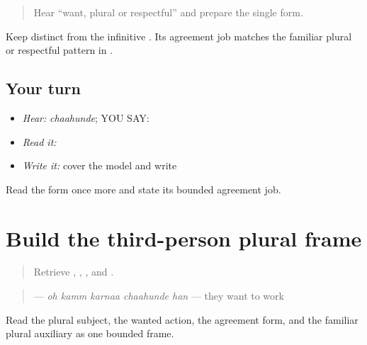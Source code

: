 \label{lesson:PA-C189-chahunde-review}



\begin{quote}
Hear “want, plural or respectful” and prepare the single form.
\end{quote}

\begin{grammarlens}[title={Grammar Lens}]
Keep \textbf{} distinct from the infinitive \textbf{}. Its agreement job matches the familiar plural or respectful pattern in \textbf{}.
\end{grammarlens}

\subsection*{Your turn}
\begin{itemize}
\raggedright
  \item \emph{Hear:} \emph{chaahunde}; YOU SAY: \textbf{}
  \item \emph{Read it:} \textbf{}
  \item \emph{Write it:} cover the model and write \textbf{}
\end{itemize}

\begin{tcolorbox}[breakable,colback=teal!4,colframe=teal!35!black,title={Before you move on}]
Read the form once more and state its bounded agreement job.
\end{tcolorbox}
\section[\texorpdfstring{\pa{ਉਹ} \pa{ਕੰਮ} \pa{ਕਰਨਾ} \pa{ਚਾਹੁੰਦੇ} \pa{ਹਨ} (oh kamm karnaa …)}{ਉਹ ਕੰਮ ਕਰਨਾ ਚਾਹੁੰਦੇ ਹਨ (oh kamm karnaa …)}]{Build the third-person plural frame}

\label{lesson:PA-C189-chahunde-han}



\begin{quote}
Retrieve \textbf{}, \textbf{}, \textbf{}, and \textbf{}.
\end{quote}

\begin{grammarlens}[title={Grammar Lens: complete statement}]
\begin{quote}
\textbf{    } — \emph{oh kamm karnaa chaahunde han} — they want to work
\end{quote}

Read the plural subject, the wanted action, the agreement form, and the familiar plural auxiliary as one bounded frame.
\end{grammarlens}

